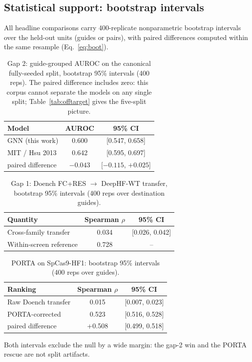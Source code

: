\subsection{Statistical support: bootstrap intervals}
\label{sec:bootstrap}
All headline comparisons carry 400-replicate nonparametric bootstrap
intervals over the held-out units (guides or pairs), with paired
differences computed within the same resample
(Eq.~\eqref{eq:boot}).

\begin{table}[h]
\centering
\caption{Gap 2: guide-grouped AUROC on the canonical fully-seeded split,
bootstrap 95\% intervals (400 reps). The paired difference includes
zero: this corpus cannot separate the models on any single split;
Table~\ref{tab:offtarget} gives the five-split picture.}
\label{tab:boot-offtarget}
\begin{tabular}{lcc}
\hline
Model & AUROC & 95\% CI \\
\hline
GNN (this work) & 0.600 & [0.547, 0.658] \\
MIT / Hsu 2013 & 0.642 & [0.595, 0.697] \\
paired difference & $-0.043$ & [$-0.115$, $+0.025$] \\
\hline
\end{tabular}
\end{table}

\begin{table}[h]
\centering
\caption{Gap 1: Doench FC+RES $\to$ DeepHF-WT transfer, bootstrap 95\%
intervals (400 reps over destination guides).}
\label{tab:boot-gap1}
\begin{tabular}{lcc}
\hline
Quantity & Spearman $\rho$ & 95\% CI \\
\hline
Cross-family transfer & 0.034 & [0.026, 0.042] \\
Within-screen reference & 0.728 & -- \\
\hline
\end{tabular}
\end{table}

\begin{table}[h]
\centering
\caption{PORTA on SpCas9-HF1: bootstrap 95\% intervals (400 reps over
guides).}
\label{tab:boot-porta}
\begin{tabular}{lcc}
\hline
Ranking & Spearman $\rho$ & 95\% CI \\
\hline
Raw Doench transfer & 0.015 & [0.007, 0.023] \\
PORTA-corrected & 0.523 & [0.516, 0.528] \\
paired difference & +0.508 & [0.499, 0.518] \\
\hline
\end{tabular}
\end{table}

Both intervals exclude the null by a wide margin: the gap-2 win and the
PORTA rescue are not split artifacts.
